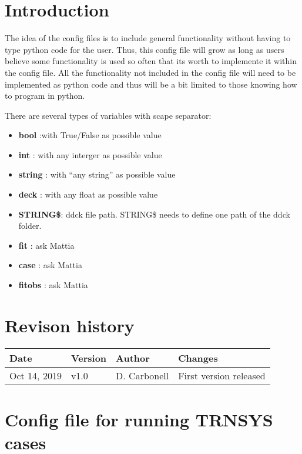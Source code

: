 \documentclass[english]{SPFReport}
\author{Dr. Daniel Carbonell}
\newcommand\Tstrut{\rule{0pt}{2.6ex}}         %
\newcommand\Bstrut{\rule[-0.9ex]{0pt}{0pt}}   %
\begin{document}
 


\section{Introduction}

The idea of the config files is to include general functionality without having to type python code for the user.
Thus, this config file will grow as long as users believe some functionality is used so often that its worth to implemente it within the config file. All the functionality not included in the config file will need to be implemented as python code and thus will be a bit limited to those knowing how to program in python. 

There are several types of variables with scape separator:
\begin{itemize}
\item \textbf{bool} :with True/False as possible value
\item \textbf{int} : with any interger as possible value
\item \textbf{string} : with ``any string'' as possible value
\item \textbf{deck} : with any float as possible value
\item \textbf{STRING\$}: ddck file path. STRING\$ needs to define one path of the ddck folder. 
\item \textbf{fit} : ask Mattia
\item \textbf{case} : ask Mattia
\item \textbf{fitobs} : ask Mattia



\end{itemize}
\section{Revison history}


\begin{tabular}{| l |  l | l  | p{80mm} | }\hline

    \textbf{Date} & \textbf{Version} & \textbf{Author}&\textbf{Changes}  \\\hline
\Tstrut\Bstrut     Oct 14, 2019 & v1.0 & D. Carbonell&First version released \\\hline
  \end{tabular}

\section{Config file for running TRNSYS cases}
\end{document}
